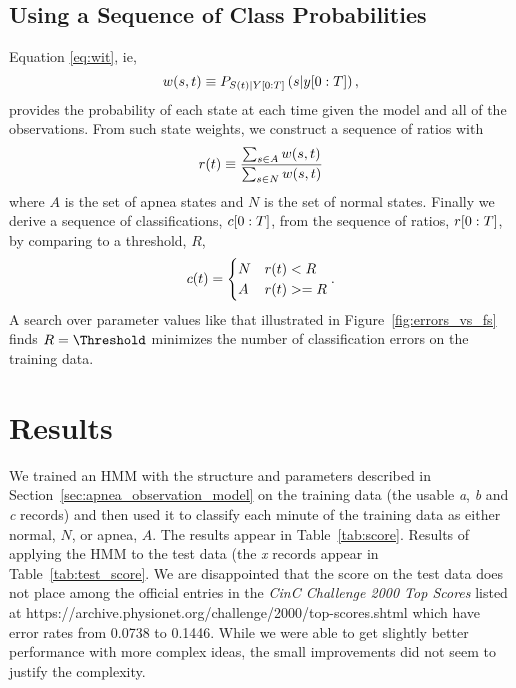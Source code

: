 \subsection{Using a Sequence of Class Probabilities}
\label{sec:prettygood}

Equation \eqref{eq:wit}, ie,
\begin{equation*}
  w(s,t) \equiv P_{{S}{(t)}|Y[0:T]} \left(s|y[0:T]
  \right),
\end{equation*}
provides the probability of each state at each time given the model and
all of the observations.  From such state weights, we construct a
sequence of ratios with
\begin{equation*}
  {r}{(t)} \equiv \frac{\sum_{s\in A} w(s,t)}{\sum_{s\in N} w(s,t)}
\end{equation*}
where $A$ is the set of apnea states and $N$ is the set of normal
states.  Finally we derive a sequence of classifications,
$c[0:T]$, from the sequence of ratios, $r[0:T]$, by
comparing to a threshold, $R$,
\begin{equation}
  \label{eq:class_sequence}
  {c}{(t)} =
  \begin{cases}
    N & {r}{(t)} < R \\
    A & {r}{(t)} >= R
  \end{cases}.
\end{equation}
A search over parameter values like that illustrated in
Figure~\ref{fig:errors_vs_fs} finds $R=\Threshold$ minimizes the number of
classification errors on the training data.

\section{Results}
\label{sec:results}

We trained an HMM with the structure and parameters described in
Section~\ref{sec:apnea_observation_model} on the training data (the
usable \emph{a}, \emph{b} and \emph{c} records) and then used it to
classify each minute of the training data as either normal, $N$, or
apnea, $A$.  The results appear in Table~\ref{tab:score}.  Results of
applying the HMM to the test data (the \emph{x} records appear in
Table~\ref{tab:test_score}.  We are disappointed that the score on the
test data does not place among the official entries in the \emph{CinC
  Challenge 2000 Top Scores} listed at
https://archive.physionet.org/challenge/2000/top-scores.shtml which
have error rates from 0.0738 to 0.1446.  While we were able to get
slightly better performance with more complex ideas, the small
improvements did not seem to justify the complexity.

